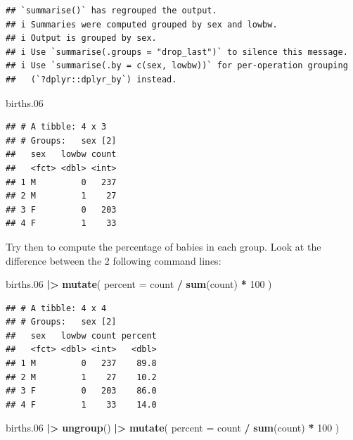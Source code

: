 \documentclass[
]{book}
\newenvironment{Shaded}{\begin{snugshade}}{\end{snugshade}}
\newcommand{\AttributeTok}[1]{\textcolor[rgb]{0.13,0.29,0.53}{#1}}
\newcommand{\DecValTok}[1]{\textcolor[rgb]{0.00,0.00,0.81}{#1}}
\newcommand{\FloatTok}[1]{\textcolor[rgb]{0.00,0.00,0.81}{#1}}
\newcommand{\FunctionTok}[1]{\textcolor[rgb]{0.13,0.29,0.53}{\textbf{#1}}}
\newcommand{\NormalTok}[1]{#1}
\newcommand{\SpecialCharTok}[1]{\textcolor[rgb]{0.81,0.36,0.00}{\textbf{#1}}}
\theoremstyle{definition}
\theoremstyle{definition}
\theoremstyle{definition}
\theoremstyle{definition}
\theoremstyle{remark}
\begin{document}
\begin{verbatim}
## `summarise()` has regrouped the output.
## i Summaries were computed grouped by sex and lowbw.
## i Output is grouped by sex.
## i Use `summarise(.groups = "drop_last")` to silence this message.
## i Use `summarise(.by = c(sex, lowbw))` for per-operation grouping
##   (`?dplyr::dplyr_by`) instead.
\end{verbatim}

\begin{Shaded}
\begin{Highlighting}[]
\NormalTok{births}\FloatTok{.06}
\end{Highlighting}
\end{Shaded}

\begin{verbatim}
## # A tibble: 4 x 3
## # Groups:   sex [2]
##   sex   lowbw count
##   <fct> <dbl> <int>
## 1 M         0   237
## 2 M         1    27
## 3 F         0   203
## 4 F         1    33
\end{verbatim}

Try then to compute the percentage of babies in each group.
Look at the difference between the 2 following command lines:

\begin{Shaded}
\begin{Highlighting}[]
\NormalTok{births}\FloatTok{.06} \SpecialCharTok{|\textgreater{}}
  \FunctionTok{mutate}\NormalTok{(}
    \AttributeTok{percent =}\NormalTok{ count }\SpecialCharTok{/} \FunctionTok{sum}\NormalTok{(count) }\SpecialCharTok{*} \DecValTok{100}
\NormalTok{  )}
\end{Highlighting}
\end{Shaded}

\begin{verbatim}
## # A tibble: 4 x 4
## # Groups:   sex [2]
##   sex   lowbw count percent
##   <fct> <dbl> <int>   <dbl>
## 1 M         0   237    89.8
## 2 M         1    27    10.2
## 3 F         0   203    86.0
## 4 F         1    33    14.0
\end{verbatim}

\begin{Shaded}
\begin{Highlighting}[]
\NormalTok{births}\FloatTok{.06} \SpecialCharTok{|\textgreater{}}
  \FunctionTok{ungroup}\NormalTok{() }\SpecialCharTok{|\textgreater{}}
  \FunctionTok{mutate}\NormalTok{(}
    \AttributeTok{percent =}\NormalTok{ count }\SpecialCharTok{/} \FunctionTok{sum}\NormalTok{(count) }\SpecialCharTok{*} \DecValTok{100}
\NormalTok{  )}
\end{Highlighting}
\end{Shaded}
\end{document}
